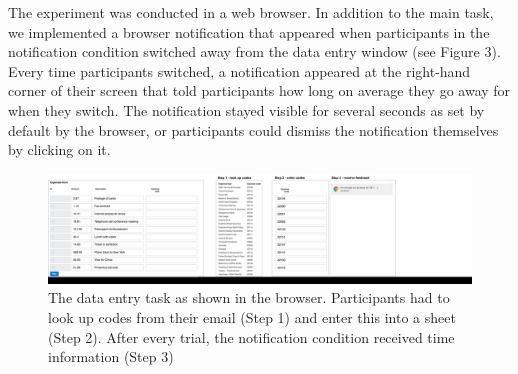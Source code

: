 The experiment was conducted in a web browser. In addition to the main task, we implemented a browser notification that appeared when participants in the notification condition switched away from the data entry window (see Figure 3). Every time participants switched, a notification appeared at the right-hand corner of their screen that told participants how long on average they go away for when they switch. The notification stayed visible for several seconds as set by default by the browser, or participants could dismiss the notification themselves by clicking on it.

\begin{figure}
\centering
\includegraphics[width=\textwidth]{images/ch56/ch56-taskinterface.pdf}
\caption{The data entry task as shown in the browser. Participants had to look up codes from their email (Step 1) and enter this into a sheet (Step 2). After every trial, the notification condition received time information (Step 3)}
\label{fig:ch56-Figure1}
\end{figure}

